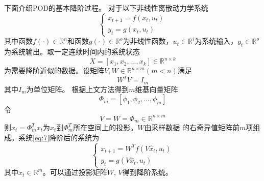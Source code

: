 下面介绍POD的基本降阶过程。
对于以下非线性离散动力学系统
\begin{equation}
\label{eq:7}
\left\{ \begin{array}{l}
  {x_{t + 1}} = f({x_t},{u_t})\\
  {y_t} = g({x_t},{u_t})
  \end{array} \right.
\end{equation}
其中函数$f( \cdot ) \in {\mathbb{R}^n}$和函数$g( \cdot ) \in {\mathbb{R}^o}$为非线性函数，${u_t} \in {\mathbb{R}^i}$为系统输入，${y_t} \in {\mathbb{R}^o}$为系统输出。取一定连续时间内的系统状态
\begin{equation}
\label{eq:8}
X = [{x_1},{x_2},...,{x_k}]  \in \mathbb{R}^{n \times k}
\end{equation}
为需要降阶近似的数据。设矩阵$V,W \in {\mathbb{R}^{n \times m}}$$(m<n)$满足
\begin{equation}
\label{eq:9}
{W^T}V = {I_m}  
\end{equation}
其中$I_m$为单位矩阵。
根据上文方法得到$m$维基向量矩阵
\begin{equation}
\label{eq:10}
{\varPhi  _m} = [{\phi _1},{\phi _2},...,{\phi _m}]
\end{equation}
令
\begin{equation}
\label{eq:11}
V = W = {\varPhi  _m} \in {{\mathbb{R}}^{n \times m}}
\end{equation}
则${\hat x_t} = \varPhi  _m^T{x_t}$为${x_t}$到$\varPhi  _m^T$所在空间上的投影。$W$由采样数据 的右奇异值矩阵前$m$项组成。系统\ref{eq:7}降阶后的系统为
\begin{equation}
\label{eq:12} 
\left\{ \begin{array}{l}
  {x_{t + 1}} = {W^T}f(V{{\hat x}_t},{u_t})\\
  {y_t} = g(V{{\hat x}_t},{u_t})
  \end{array} \right.
\end{equation}
其中${\hat x_t} \in {\mathbb{R}^m}$。可以通过投影矩阵$W$, $V$得到降阶系统。

